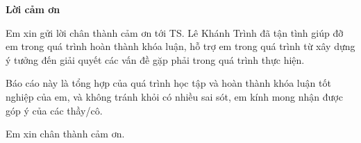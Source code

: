 \setlength{\parindent}{2em}
\begin{center}
\textbf{\large{Lời cảm ơn}	}
\end{center}

Em xin gửi lời chân thành cảm ơn tới TS. Lê Khánh Trình đã tận tình giúp
đỡ em trong quá trình hoàn thành khóa luận, hỗ trợ em trong quá trình từ xây
dựng ý tưởng đến giải quyết các vấn đề gặp phải trong quá trình thực hiện.

Báo cáo này là tổng hợp của quá trình học tập và hoàn thành khóa luận tốt
nghiệp của em, và không tránh khỏi có nhiều sai sót, em kính mong nhận được
góp ý của các thầy/cô.

Em xin chân thành cảm ơn.   
